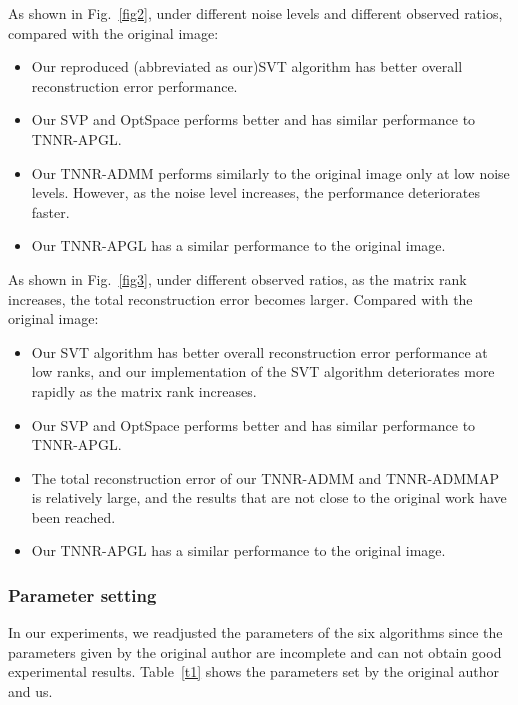 \documentclass[fontset=windows]{article}
\begin{document}
{As shown in Fig.~\ref{fig2}, under different noise levels and different observed ratios, compared with the original image:
\begin{itemize}
    \item Our reproduced (abbreviated as our)SVT algorithm has better overall reconstruction error performance.
    
    \item Our SVP and OptSpace performs better and has similar performance to TNNR-APGL.
    
    \item Our TNNR-ADMM performs similarly to the original image only at low noise levels. However, as the noise level increases, the performance deteriorates faster.
    
    \item Our TNNR-APGL has a similar performance to the original image.
\end{itemize}

As shown in Fig.~\ref{fig3}, under different observed ratios, as the
matrix rank increases, the total reconstruction error becomes larger. Compared with the original image:
\begin{itemize}
    \item Our SVT algorithm has better overall reconstruction error performance at low ranks, and our implementation of the SVT algorithm deteriorates more rapidly as the matrix rank increases.
    
    \item Our SVP and OptSpace performs better and has similar performance to TNNR-APGL.
    
    \item The total reconstruction error of our TNNR-ADMM and TNNR-ADMMAP is relatively large, and the results that are not close to the original work have been reached.
    
    \item Our TNNR-APGL has a similar performance to the original image.
\end{itemize}


\subsubsection{Parameter setting}
In our experiments, we readjusted the parameters of the six algorithms since the parameters given by the original author are incomplete and can not obtain good experimental results. Table~\ref{t1} shows the parameters set by the original author and us.

}
\end{document}
